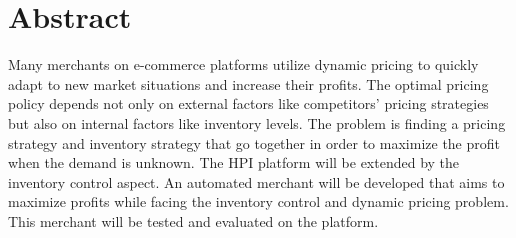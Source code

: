\chapter*{Abstract}

Many merchants on e-commerce platforms utilize dynamic pricing to quickly adapt to new market situations and increase their profits. %
The optimal pricing policy depends not only on external factors like competitors' pricing strategies but also on internal factors like inventory levels. %
The problem is finding a pricing strategy and inventory strategy that go together in order to maximize the profit when the demand is unknown.
The HPI \pricewars platform will be extended by the inventory control aspect.
An automated merchant will be developed that aims to maximize profits while facing the inventory control and dynamic pricing problem.
This merchant will be tested and evaluated on the \pricewars platform.

